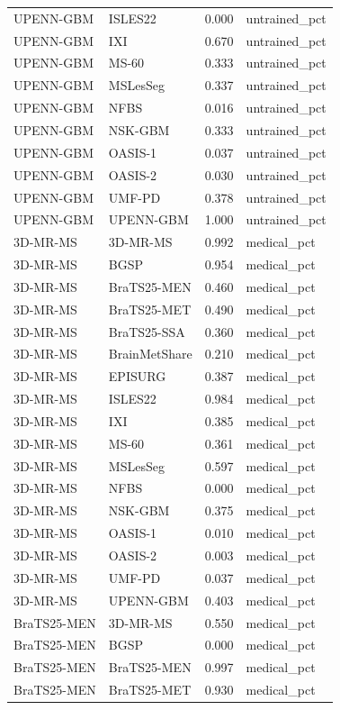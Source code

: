 \begin{tabular}{llrl}
UPENN-GBM & ISLES22 & 0.000 & untrained\_pct \\
UPENN-GBM & IXI & 0.670 & untrained\_pct \\
UPENN-GBM & MS-60 & 0.333 & untrained\_pct \\
UPENN-GBM & MSLesSeg & 0.337 & untrained\_pct \\
UPENN-GBM & NFBS & 0.016 & untrained\_pct \\
UPENN-GBM & NSK-GBM & 0.333 & untrained\_pct \\
UPENN-GBM & OASIS-1 & 0.037 & untrained\_pct \\
UPENN-GBM & OASIS-2 & 0.030 & untrained\_pct \\
UPENN-GBM & UMF-PD & 0.378 & untrained\_pct \\
UPENN-GBM & UPENN-GBM & 1.000 & untrained\_pct \\
3D-MR-MS & 3D-MR-MS & 0.992 & medical\_pct \\
3D-MR-MS & BGSP & 0.954 & medical\_pct \\
3D-MR-MS & BraTS25-MEN & 0.460 & medical\_pct \\
3D-MR-MS & BraTS25-MET & 0.490 & medical\_pct \\
3D-MR-MS & BraTS25-SSA & 0.360 & medical\_pct \\
3D-MR-MS & BrainMetShare & 0.210 & medical\_pct \\
3D-MR-MS & EPISURG & 0.387 & medical\_pct \\
3D-MR-MS & ISLES22 & 0.984 & medical\_pct \\
3D-MR-MS & IXI & 0.385 & medical\_pct \\
3D-MR-MS & MS-60 & 0.361 & medical\_pct \\
3D-MR-MS & MSLesSeg & 0.597 & medical\_pct \\
3D-MR-MS & NFBS & 0.000 & medical\_pct \\
3D-MR-MS & NSK-GBM & 0.375 & medical\_pct \\
3D-MR-MS & OASIS-1 & 0.010 & medical\_pct \\
3D-MR-MS & OASIS-2 & 0.003 & medical\_pct \\
3D-MR-MS & UMF-PD & 0.037 & medical\_pct \\
3D-MR-MS & UPENN-GBM & 0.403 & medical\_pct \\
BraTS25-MEN & 3D-MR-MS & 0.550 & medical\_pct \\
BraTS25-MEN & BGSP & 0.000 & medical\_pct \\
BraTS25-MEN & BraTS25-MEN & 0.997 & medical\_pct \\
BraTS25-MEN & BraTS25-MET & 0.930 & medical\_pct \\

\end{tabular}
